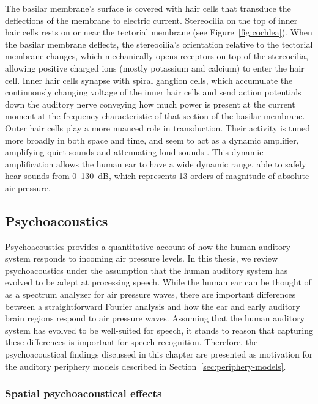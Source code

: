 The basilar membrane's surface is covered
with hair cells that transduce
the deflections of the membrane
to electric current.
Stereocilia on the top of inner hair cells
rests on or near the tectorial membrane
(see Figure~\ref{fig:cochlea}).
When the basilar membrane deflects,
the stereocilia's orientation
relative to the tectorial membrane changes,
which mechanically opens receptors
on top of the stereocilia,
allowing positive charged ions
(mostly potassium and calcium)
to enter the hair cell.
Inner hair cells synapse with
spiral ganglion cells,
which accumulate the continuously
changing voltage of the inner hair cells
and send action potentials
down the auditory nerve
conveying how much power
is present at the current moment
at the frequency characteristic
of that section of the basilar membrane.
Outer hair cells play a more nuanced
role in transduction.
Their activity is tuned
more broadly in both space and time,
and seem to act as a dynamic amplifier,
amplifying quiet sounds and
attenuating loud sounds
\citep{dallos1992}.
This dynamic amplification allows
the human ear to have a wide dynamic range,
able to safely hear sounds from 0--130~dB,
which represents 13 orders of magnitude
of absolute air pressure.

\subsection{Psychoacoustics}
\label{sec:psychoacoustics}

Psychoacoustics provides a quantitative account
of how the human auditory system
responds to incoming air pressure levels.
In this thesis, we review psychoacoustics
under the assumption that
the human auditory system
has evolved to be adept at processing speech.
While the human ear can be thought of
as a spectrum analyzer for air pressure waves,
there are important differences between
a straightforward Fourier analysis
and how the ear and early auditory brain regions
respond to air pressure waves.
Assuming that the human
auditory system has evolved to be
well-suited for speech,
it stands to reason that
capturing these differences
is important for speech recognition.
Therefore, the psychoacoustical findings
discussed in this chapter
are presented as motivation for the
auditory periphery models described
in Section~\ref{sec:periphery-models}.

\subsubsection{Spatial psychoacoustical effects}


